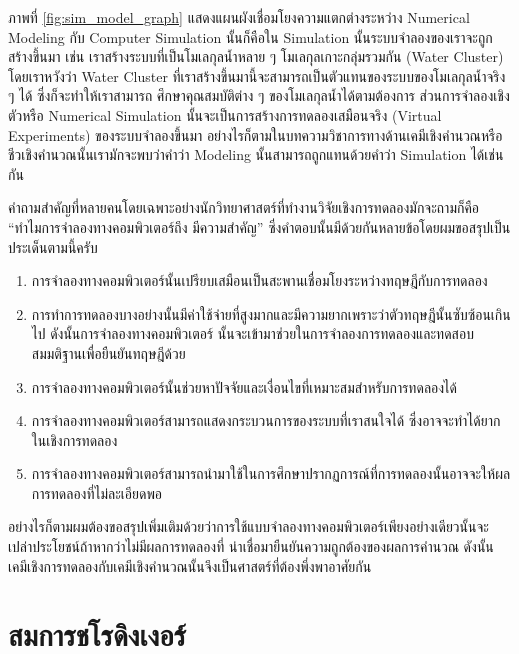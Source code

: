 ภาพที่ \ref{fig:sim_model_graph} แสดงแผนผังเชื่อมโยงความแตกต่างระหว่าง Numerical Modeling กับ Computer Simulation 
นั้นก็คือใน Simulation นั้นระบบจำลองของเราจะถูกสร้างขึ้นมา เช่น เราสร้างระบบที่เป็นโมเลกุลน้ำหลาย ๆ โมเลกุลเกาะกลุ่มรวมกัน (Water 
Cluster) โดยเราหวังว่า Water Cluster ที่เราสร้างขึ้นมานี้จะสามารถเป็นตัวแทนของระบบของโมเลกุลน้ำจริง ๆ ได้ ซึ่งก็จะทำให้เราสามารถ%
ศึกษาคุณสมบัติต่าง ๆ ของโมเลกุลน้ำได้ตามต้องการ ส่วนการจำลองเชิงตัวหรือ Numerical Simulation นั้นจะเป็นการสร้างการทดลองเสมือนจริง 
(Virtual Experiments) ของระบบจำลองขึ้นมา อย่างไรก็ตามในบทความวิชาการทางด้านเคมีเชิงคำนวณหรือชีวเชิงคำนวณนั้นเรามักจะพบว่าคำว่า 
Modeling นั้นสามารถถูกแทนด้วยคำว่า Simulation ได้เช่นกัน

คำถามสำคัญที่หลายคนโดยเฉพาะอย่างนักวิทยาศาสตร์ที่ทำงานวิจัยเชิงการทดลองมักจะถามก็คือ \enquote{ทำไมการจำลองทางคอมพิวเตอร์ถึง%
มีความสำคัญ} ซึ่งคำตอบนั้นมีด้วยกันหลายข้อโดยผมขอสรุปเป็นประเด็นตามนี้ครับ

\begin{enumerate}
    \item การจำลองทางคอมพิวเตอร์นั้นเปรียบเสมือนเป็นสะพานเชื่อมโยงระหว่างทฤษฎีกับการทดลอง
    
    \item การทำการทดลองบางอย่างนั้นมีค่าใช้จ่ายที่สูงมากและมีความยากเพราะว่าตัวทฤษฎีนั้นซับซ้อนเกินไป ดังนั้นการจำลองทางคอมพิวเตอร์%
    นั้นจะเข้ามาช่วยในการจำลองการทดลองและทดสอบสมมติฐานเพื่อยืนยันทฤษฎีด้วย
    
    \item การจำลองทางคอมพิวเตอร์นั้นช่วยหาปัจจัยและเงื่อนไขที่เหมาะสมสำหรับการทดลองได้
    
    \item การจำลองทางคอมพิวเตอร์สามารถแสดงกระบวนการของระบบที่เราสนใจได้ ซึ่งอาจจะทำได้ยากในเชิงการทดลอง
    
    \item การจำลองทางคอมพิวเตอร์สามารถนำมาใช้ในการศึกษาปรากฏการณ์ที่การทดลองนั้นอาจจะให้ผลการทดลองที่ไม่ละเอียดพอ
\end{enumerate}

อย่างไรก็ตามผมต้องขอสรุปเพิ่มเติมด้วยว่าการใช้แบบจำลองทางคอมพิวเตอร์เพียงอย่างเดียวนั้นจะเปล่าประโยชน์ถ้าหากว่าไม่มีผลการทดลองที่%
น่าเชื่อมายืนยันความถูกต้องของผลการคำนวณ ดังนั้นเคมีเชิงการทดลองกับเคมีเชิงคำนวณนั้นจึงเป็นศาสตร์ที่ต้องพึ่งพาอาศัยกัน

\section{สมการชโรดิงเงอร์}

